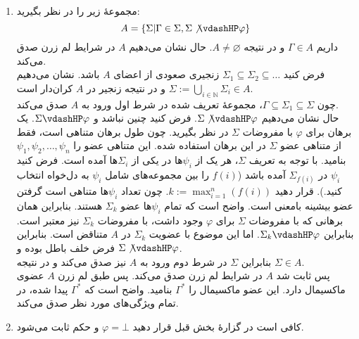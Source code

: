 \begin{ans}
    \begin{enumerate}[label=(\alph*)]
        \item
        مجموعهٔ زیر را در نظر بگیرید:
        $$A = \{\Sigma | \Gamma \in \Sigma, \Sigma \not\vdashHP \varphi\}$$
        داریم $\Gamma \in A$ و در نتیجه $A \neq \varnothing$. حال نشان می‌دهیم $A$ در شرایط لم زرن صدق می‌کند.\\
        فرض کنید $\Sigma_1 \subseteq \Sigma_2 \subseteq \dots$ زنجیری صعودی از اعضای $A$ باشد. نشان می‌دهیم $\Sigma := \bigcup_{i\in\mathbb{N}} \Sigma_i \in A$ و در نتیجه زنجیر در $A$ کران‌دار است.\\
        چون $\Gamma \subseteq \Sigma_1 \subseteq \Sigma$، مجموعهٔ تعریف شده در شرط اول ورود به $A$ صدق می‌کند.\\
        حال نشان می‌دهیم $\Sigma \not\vdashHP \varphi$. فرض کنید چنین نباشد و $\Sigma \vdashHP \varphi$. یک برهان برای $\varphi$ با مفروضات $\Sigma$ در نظر بگیرید. چون طول برهان متناهی است، فقط از متناهی عضو $\Sigma$ در این برهان استفاده شده. این متناهی عضو را $\psi_1, \psi_2, \dots, \psi_n$ بنامید. با توجه به تعریف $\Sigma$، هر یک از $\psi_i$ها در یکی از $\Sigma_i$ها آمده است. فرض کنید $\psi_i$ در $\Sigma_{f(i)}$ آمده باشد ($f(i)$ را بین مجموعه‌های شامل $\psi_i$ به دل‌خواه انتخاب کنید.). قرار دهید $k := \max_{i=1}^n(f(i))$. چون تعداد $\psi_i$ها متناهی است گرفتن عضو بیشینه بامعنی است. واضح است که تمام $\psi_i$ها عضو $\Sigma_k$ هستند. بنابراین همان برهانی که با مفروضات $\Sigma$ برای $\varphi$ وجود داشت، با مفروضات $\Sigma_k$ نیز معتبر است. بنابراین $\Sigma_k \vdashHP \varphi$. اما این موضوع با عضویت $\Sigma_k$ در $A$ متناقض است. بنابراین فرض خلف باطل بوده و $\Sigma \not\vdashHP \varphi$.\\
        بنابراین $\Sigma$ در شرط دوم ورود به $A$ نیز صدق می‌کند و در نتیجه $\Sigma \in A$.\\
        پس ثابت شد $A$ در شرایط لم زرن صدق می‌کند. پس طبق لم زرن $A$ عضوی ماکسیمال دارد. این عضو ماکسیمال را $\Gamma^*$ بنامید. واضح است که $\Gamma^*$ پیدا شده، در تمام ویژگی‌های مورد نظر صدق می‌کند.
    
        \item
        کافی است در گزارهٔ بخش قبل قرار دهید $\varphi = \bot$ و حکم ثابت می‌شود.
    

\end{enumerate}
\end{ans}
